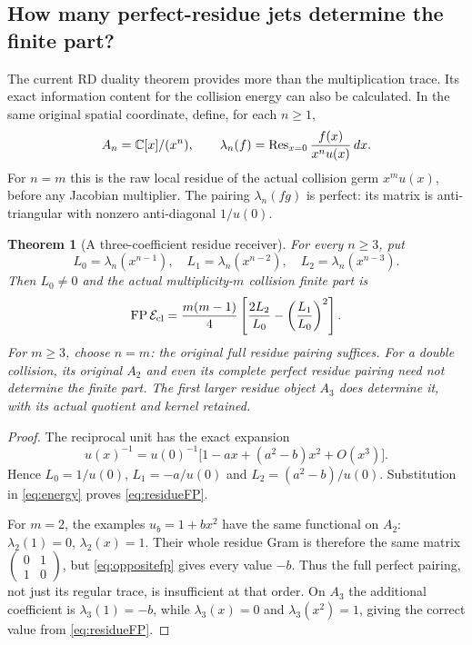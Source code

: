 \documentclass[11pt,a4paper]{article}
\newtheorem{theorem}{Theorem}[section]
\theoremstyle{definition}
\newcommand{\FP}{\operatorname{FP}}\newcommand{\im}{\operatorname{im}}
\begin{document}
\subsection{How many perfect-residue jets determine the finite part?}
The current RD duality theorem provides more than the multiplication trace. Its exact information content for the collision energy can also be calculated. In the same original spatial coordinate, define, for each $n\ge1$,
\[
 A_n=\mathbb C[x]/(x^n),\qquad
 \lambda_n(f)=\operatorname{Res}_{x=0}\frac{f(x)}{x^nu(x)}\,dx.
\]
For $n=m$ this is the raw local residue of the actual collision germ $x^mu(x)$, before any Jacobian multiplier. The pairing $\lambda_n(fg)$ is perfect: its matrix is anti-triangular with nonzero anti-diagonal $1/u(0)$.
\begin{theorem}[A three-coefficient residue receiver]\label{thm:residuejet}
For every $n\ge3$, put
\[
 L_0=\lambda_n(x^{n-1}),\quad
 L_1=\lambda_n(x^{n-2}),\quad
 L_2=\lambda_n(x^{n-3}).
\]
Then $L_0\ne0$ and the actual multiplicity-$m$ collision finite part is
\begin{equation}\label{eq:residueFP}
 \FP\mathcal E_{\rm cl}
 =\frac{m(m-1)}4
 \left[\frac{2L_2}{L_0}-\left(\frac{L_1}{L_0}\right)^2\right].
\end{equation}
For $m\ge3$, choose $n=m$: the original full residue pairing suffices. For a double collision, its original $A_2$ and even its complete perfect residue pairing need not determine the finite part. The first larger residue object $A_3$ does determine it, with its actual quotient and kernel retained.
\end{theorem}
\begin{proof}
The reciprocal unit has the exact expansion
\[
 u(x)^{-1}=u(0)^{-1}\bigl[1-ax+(a^2-b)x^2+O(x^3)\bigr].
\]
Hence $L_0=1/u(0)$, $L_1=-a/u(0)$ and $L_2=(a^2-b)/u(0)$. Substitution in \eqref{eq:energy} proves \eqref{eq:residueFP}.

For $m=2$, the examples $u_b=1+bx^2$ have the same functional on $A_2$: $\lambda_2(1)=0$, $\lambda_2(x)=1$. Their whole residue Gram is therefore the same matrix $\left(\begin{smallmatrix}0&1\\1&0\end{smallmatrix}\right)$, but \eqref{eq:oppositefp} gives every value $-b$. Thus the full perfect pairing, not just its regular trace, is insufficient at that order. On $A_3$ the additional coefficient is $\lambda_3(1)=-b$, while $\lambda_3(x)=0$ and $\lambda_3(x^2)=1$, giving the correct value from \eqref{eq:residueFP}.
\end{proof}
\end{document}
